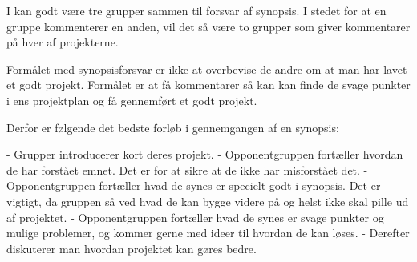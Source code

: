\documentclass[10pt,a4paper,final]{report}
\begin{document}
I kan godt være tre grupper sammen til forsvar af synopsis. I stedet for at en gruppe kommenterer en anden, vil det så være to grupper som giver kommentarer på hver af projekterne.

Formålet med synopsisforsvar er ikke at overbevise de andre om at man har lavet et godt projekt. Formålet er at få kommentarer så kan kan finde de svage punkter i ens projektplan og få gennemført et godt projekt.

Derfor er følgende det bedste forløb i gennemgangen af en synopsis:

- Grupper introducerer kort deres projekt.
- Opponentgruppen fortæller hvordan de har forstået emnet. Det er for at sikre at de ikke har misforstået det.
- Opponentgruppen fortæller hvad de synes er specielt godt i synopsis. Det er vigtigt, da gruppen så ved hvad de kan bygge videre på og helst ikke skal pille ud af projektet.
- Opponentgruppen fortæller hvad de synes er svage punkter og mulige problemer, og kommer gerne med ideer til hvordan de kan løses.
- Derefter diskuterer man hvordan projektet kan gøres bedre.
\end{document}
